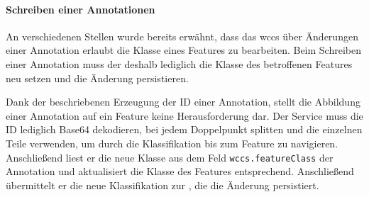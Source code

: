     \paragraph{Schreiben einer Annotationen}
    An verschiedenen Stellen wurde bereits erwähnt,
    dass das \gls{wccs} über Änderungen einer Annotation erlaubt die Klasse eines Features zu bearbeiten.
    Beim Schreiben einer Annotation muss der {\annotationService} deshalb lediglich
    die Klasse des betroffenen Features neu setzen und die Änderung persistieren.

    Dank der beschriebenen Erzeugung der ID einer Annotation,
    stellt die Abbildung einer Annotation auf ein Feature keine Herausforderung dar.
    Der Service muss die ID lediglich Base64 dekodieren,
    bei jedem Doppelpunkt splitten und die einzelnen Teile verwenden,
    um durch die Klassifikation bis zum Feature zu navigieren.
    Anschließend liest er die neue Klasse aus dem Feld \texttt{wccs.featureClass} der Annotation
    und aktualisiert die Klasse des Features entsprechend.
    Anschließend übermittelt er die neue Klassifikation zur {\classificationStorageAPI},
    die die Änderung persistiert.
